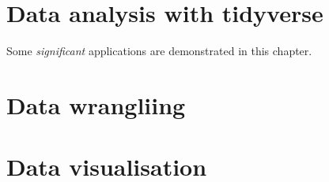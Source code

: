 \documentclass[]{book}
\begin{document}
\hypertarget{data-analysis-with-tidyverse}{%
\chapter{Data analysis with tidyverse}\label{data-analysis-with-tidyverse}}

Some \emph{significant} applications are demonstrated in this chapter.

\hypertarget{data-wrangliing}{%
\chapter{Data wrangliing}\label{data-wrangliing}}

\hypertarget{data-visualisation}{%
\chapter{Data visualisation}\label{data-visualisation}}


\end{document}
